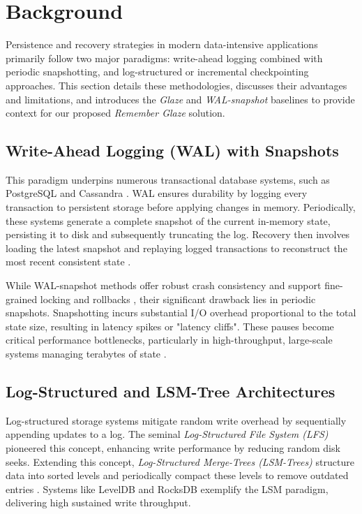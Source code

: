 \documentclass[conference]{IEEEtran}
\begin{document}
\section{Background}

Persistence and recovery strategies in modern data-intensive applications primarily follow two major paradigms: write-ahead logging combined with periodic snapshotting, and log-structured or incremental checkpointing approaches. This section details these methodologies, discusses their advantages and limitations, and introduces the \textit{Glaze} and \textit{WAL-snapshot} baselines to provide context for our proposed \textit{Remember Glaze} solution.

\subsection{Write-Ahead Logging (WAL) with Snapshots}

This paradigm underpins numerous transactional database systems, such as PostgreSQL \cite{postgresql_docs} and Cassandra \cite{lakshman2010cassandra}. WAL ensures durability by logging every transaction to persistent storage before applying changes in memory. Periodically, these systems generate a complete snapshot of the current in-memory state, persisting it to disk and subsequently truncating the log. Recovery then involves loading the latest snapshot and replaying logged transactions to reconstruct the most recent consistent state \cite{mohan1992aries}.

While WAL-snapshot methods offer robust crash consistency and support fine-grained locking and rollbacks \cite{mohan1992aries}, their significant drawback lies in periodic snapshots. Snapshotting incurs substantial I/O overhead proportional to the total state size, resulting in latency spikes or "latency cliffs". These pauses become critical performance bottlenecks, particularly in high-throughput, large-scale systems managing terabytes of state \cite{kalantar1998oracle}.

\subsection{Log-Structured and LSM-Tree Architectures}

Log-structured storage systems mitigate random write overhead by sequentially appending updates to a log. The seminal \textit{Log-Structured File System (LFS)} \cite{rosenblum1992lfs} pioneered this concept, enhancing write performance by reducing random disk seeks. Extending this concept, \textit{Log-Structured Merge-Trees (LSM-Trees)} structure data into sorted levels and periodically compact these levels to remove outdated entries \cite{o1996lsm}. Systems like LevelDB and RocksDB exemplify the LSM paradigm, delivering high sustained write throughput.
\end{document}
